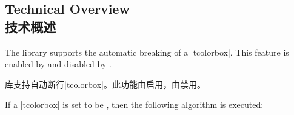 
\subsection{Technical Overview\\技术概述}
The library  supports the automatic breaking of a |tcolorbox|.
This feature is enabled by 
and disabled by .

库支持自动断行|tcolorbox|。此功能由启用，由禁用。
{

If a |tcolorbox| is set to be , then the following
algorithm is executed:

}
